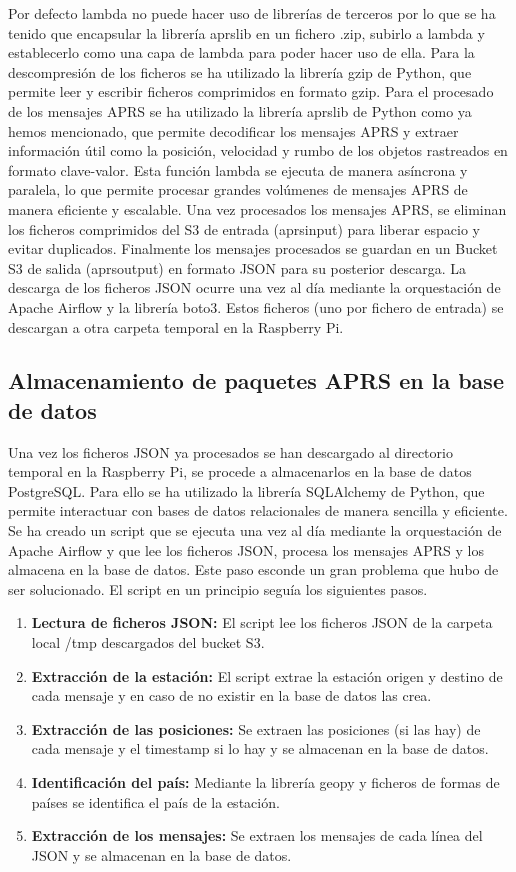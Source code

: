 Por defecto lambda no puede hacer uso de librerías de terceros por lo que se ha tenido que encapsular la librería aprslib en un fichero .zip, subirlo a lambda y establecerlo como una capa de lambda para poder hacer uso de ella.
Para la descompresión de los ficheros se ha utilizado la librería gzip de Python, que permite leer y escribir ficheros comprimidos en formato gzip.
Para el procesado de los mensajes APRS se ha utilizado la librería aprslib de Python como ya hemos mencionado, que permite decodificar los mensajes APRS y extraer información útil como la posición, velocidad y rumbo de los objetos rastreados en formato clave-valor.
Esta función lambda se ejecuta de manera asíncrona y paralela, lo que permite procesar grandes volúmenes de mensajes APRS de manera eficiente y escalable. Una vez procesados los mensajes APRS, se eliminan los ficheros comprimidos del S3 de entrada (aprsinput) para liberar espacio y evitar duplicados.
Finalmente los mensajes procesados se guardan en un Bucket S3 de salida (aprsoutput) en formato JSON para su posterior descarga. La descarga de los ficheros JSON ocurre una vez al día mediante la orquestación de Apache Airflow y la librería boto3. Estos ficheros (uno por fichero de entrada) se descargan a otra carpeta temporal en la Raspberry Pi.


\subsection{Almacenamiento de paquetes APRS en la base de datos}
Una vez los ficheros JSON ya procesados se han descargado al directorio temporal en la Raspberry Pi, se procede a almacenarlos en la base de datos PostgreSQL. Para ello se ha utilizado la librería SQLAlchemy de Python, que permite interactuar con bases de datos relacionales de manera sencilla y eficiente. Se ha creado un script que se ejecuta una vez al día mediante la orquestación de Apache Airflow y que lee los ficheros JSON, procesa los mensajes APRS y los almacena en la base de datos.
Este paso esconde un gran problema que hubo de ser solucionado. El script en un principio seguía los siguientes pasos.

\begin{enumerate}
	\item \textbf{Lectura de ficheros JSON:} El script lee los ficheros JSON de la carpeta local /tmp descargados del bucket S3.
	\item \textbf{Extracción de la estación:} El script extrae la estación origen y destino de cada mensaje y en caso de no existir en la base de datos las crea.
	\item \textbf{Extracción de las posiciones:} Se extraen las posiciones (si las hay) de cada mensaje y el timestamp si lo hay y se almacenan en la base de datos.
	\item \textbf{Identificación del país:} Mediante la librería geopy y ficheros de formas de países se identifica el país de la estación.
	\item \textbf{Extracción de los mensajes:} Se extraen los mensajes de cada línea del JSON y se almacenan en la base de datos.
\end{enumerate}

